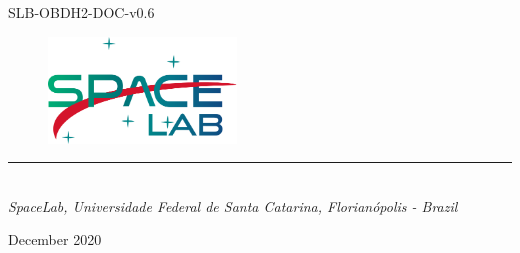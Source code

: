 %
%
%
%
%

%
%
%
%
%
%

\begin{titlepage}

\thispagestyle{empty}

\begin{flushleft}
SLB-OBDH2-DOC-v0.6
\end{flushleft}

\begin{figure}[!ht]
    \begin{flushleft}
        \includegraphics[width=5cm]{figures/spacelab.png}
    \end{flushleft}
\end{figure}

\begin{flushleft}
\Huge{\textbf{\thetitle}}
\rule[0pt]{\textwidth}{5pt}
\end{flushleft}

\vspace{0.2cm}

\begin{flushleft}
\textit{\thetitle} \\
\textit{SpaceLab, Universidade Federal de Santa Catarina, Florianópolis - Brazil}
\end{flushleft}

\vfill
\vfill

\begin{flushright}
December 2020
\end{flushright}

\end{titlepage}
